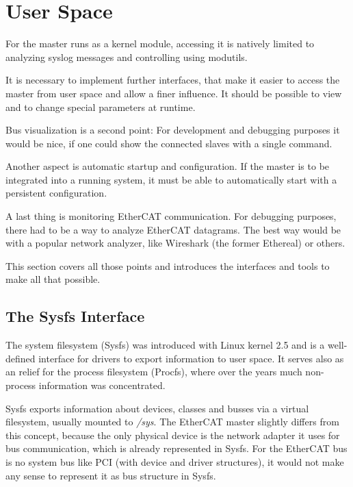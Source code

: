 \documentclass[a4paper,12pt,BCOR6mm,bibtotoc,idxtotoc]{scrbook}
\begin{document}

\section{User Space}
\label{sec:user}

For the master runs as a kernel module, accessing it is natively
limited to analyzing syslog messages and controlling using modutils.

It is necessary to implement further interfaces, that make it easier
to access the master from user space and allow a finer influence. It
should be possible to view and to change special parameters at runtime.

Bus visualization is a second point: For development and debugging
purposes it would be nice, if one could show the connected slaves with
a single command.

Another aspect is automatic startup and configuration. If the master
is to be integrated into a running system, it must be able to
automatically start with a persistent configuration.

A last thing is monitoring EtherCAT communication. For debugging
purposes, there had to be a way to analyze EtherCAT datagrams. The
best way would be with a popular network analyzer, like Wireshark
\cite{wireshark} (the former Ethereal) or others.

This section covers all those points and introduces the interfaces and
tools to make all that possible.


\subsection{The Sysfs Interface}
\label{sec:sysfs}

The system filesystem (Sysfs) was introduced with Linux
kernel 2.5 and is a well-defined interface for drivers to export
information to user space. It serves also as an relief for the process
filesystem (Procfs), where over the years much non-process information
was concentrated.

Sysfs exports information about devices, classes and busses via a
virtual filesystem, usually mounted to \textit{/sys}. The EtherCAT
master slightly differs from this concept, because the only physical
device is the network adapter it uses for bus communication, which is
already represented in Sysfs. For the EtherCAT bus is no system bus
like PCI (with device and driver structures), it would not make any
sense to represent it as bus structure in Sysfs.
\end{document}
